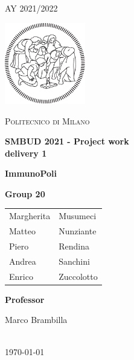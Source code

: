 \documentclass[a4paper, 12p]{article}
\begin{document}
\begin{titlepage}
    \centering
    {\scshape\large AY 2021/2022 \par}
    \vfill
    \includegraphics[width=100pt]{images/logo-polimi-new.pdf}\par\vspace{1cm}
    {\scshape\LARGE Politecnico di Milano \par}
    \vspace{1.5cm}
    {\huge\bfseries SMBUD 2021 - Project work\@ \\ delivery 1  \par}
    
    \vspace{1.5cm}
 
     {\huge\bfseries ImmunoPoli \par}

    \vspace{1.5cm}

    {\large \textbf{Group 20} \par
    
    
        
    \begin{center}
        {\begin{tabular}{l l }
        Margherita & Musumeci \\
        Matteo & Nunziante \\
        Piero & Rendina \\
        Andrea & Sanchini \\
        Enrico & Zuccolotto \\
        \end{tabular}}
        
    \end{center}
    }
    \vfill
    \begin{center}
        {\large \textbf{Professor}\par
            Marco Brambilla}
          \vspace{1cm}
        {\large \\ \today \par}
    \end{center}
\end{titlepage}
\thispagestyle{plain}
\end{document}
